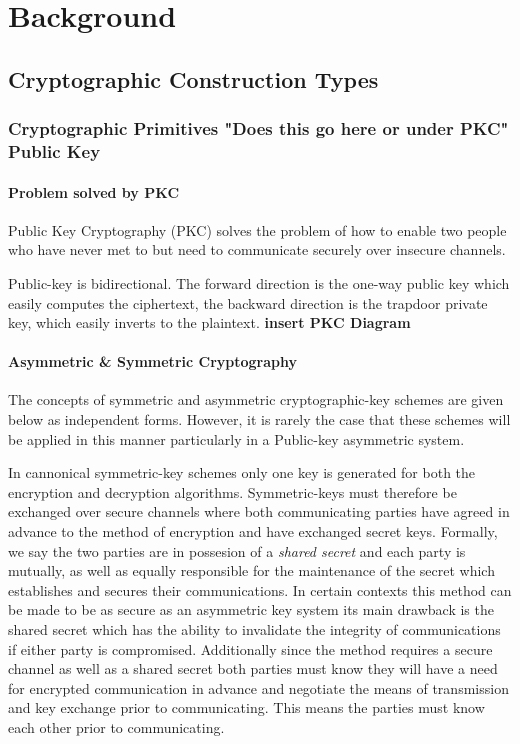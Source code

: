 \chapter{Background}

\section{Cryptographic Construction Types}

\subsection{Cryptographic Primitives "Does this go here or under PKC" Public Key}

\subsubsection{Problem solved by PKC}

Public Key Cryptography (PKC) solves the problem of how to enable two people who have never met to but need to communicate securely over insecure channels. 
 

Public-key is bidirectional. The forward direction is the one-way public key which easily computes the ciphertext, the backward direction is the trapdoor private key,
which easily inverts to the plaintext. 
\textbf{insert PKC Diagram}

\subsubsection{Asymmetric & Symmetric Cryptography} 

The concepts of symmetric and asymmetric cryptographic-key schemes are given below as independent forms. However, it is rarely the case that these schemes will be applied in this manner particularly in a Public-key asymmetric system.


In cannonical symmetric-key schemes only one key is generated for both the encryption and decryption algorithms. Symmetric-keys must therefore be exchanged over secure channels where both communicating parties have agreed in advance to the method of encryption and have exchanged secret keys. 
\newline
Formally, we say the two parties are in possesion of a \textit{shared secret} and each party is mutually, as well as equally responsible for the maintenance of the secret which establishes and secures their communications. 
In certain contexts this method can be made to be as secure as an asymmetric key system its main drawback is the shared secret which has the ability to invalidate the integrity of communications if either party is compromised.
\newline
Additionally since the method requires a secure channel as well as a shared secret both parties must know they will have a need for encrypted communication in advance and negotiate the means of transmission and key exchange prior to communicating. This means the parties must know each other prior to communicating. 

